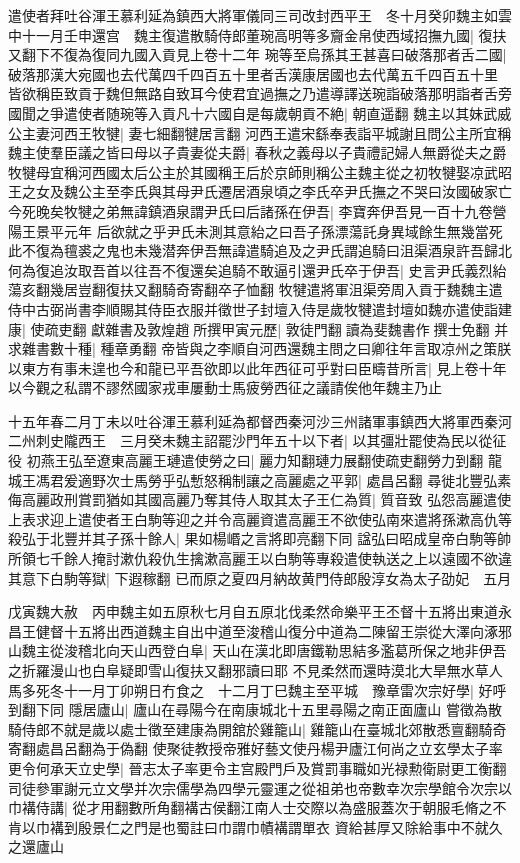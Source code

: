 遣使者拜吐谷渾王慕利延為鎮西大將軍儀同三司改封西平王　冬十月癸卯魏主如雲中十一月壬申還宫　魏主復遣散騎侍郎董琬高明等多齎金帛使西域招撫九國|{
	復扶又翻下不復為復同九國入貢見上卷十二年}
琬等至烏孫其王甚喜曰破落那者舌二國|{
	破落那漢大宛國也去代萬四千四百五十里者舌漢康居國也去代萬五千四百五十里}
皆欲稱臣致貢于魏但無路自致耳今使君宜過撫之乃遣導譯送琬詣破落那明詣者舌旁國聞之爭遣使者随琬等入貢凡十六國自是每歲朝貢不絶|{
	朝直遥翻}
魏主以其妹武威公主妻河西王牧犍|{
	妻七細翻犍居言翻}
河西王遣宋繇奉表詣平城謝且問公主所宜稱魏主使羣臣議之皆曰母以子貴妻從夫爵|{
	春秋之義母以子貴禮記婦人無爵從夫之爵}
牧犍母宜稱河西國太后公主於其國稱王后於京師則稱公主魏主從之初牧犍娶凉武昭王之女及魏公主至李氏與其母尹氏遷居酒泉頃之李氏卒尹氏撫之不哭曰汝國破家亡今死晚矣牧犍之弟無諱鎮酒泉謂尹氏曰后諸孫在伊吾|{
	李寶奔伊吾見一百十九卷營陽王景平元年}
后欲就之乎尹氏未測其意紿之曰吾子孫漂蕩託身異域餘生無幾當死此不復為氊裘之鬼也未幾潜奔伊吾無諱遣騎追及之尹氏謂追騎曰沮渠酒泉許吾歸北何為復追汝取吾首以往吾不復還矣追騎不敢逼引還尹氏卒于伊吾|{
	史言尹氏義烈紿蕩亥翻幾居豈翻復扶又翻騎奇寄翻卒子恤翻}
牧犍遣將軍沮渠旁周入貢于魏魏主遣侍中古弼尚書李順賜其侍臣衣服并徵世子封壇入侍是歲牧犍遣封壇如魏亦遣使詣建康|{
	使疏吏翻}
獻雜書及敦煌趙所撰甲寅元歷|{
	敦徒門翻讀為斐魏書作撰士免翻}
并求雜書數十種|{
	種章勇翻}
帝皆與之李順自河西還魏主問之曰卿往年言取凉州之策朕以東方有事未遑也今和龍已平吾欲即以此年西征可乎對曰臣疇昔所言|{
	見上卷十年}
以今觀之私謂不謬然國家戎車屢動士馬疲勞西征之議請俟他年魏主乃止

十五年春二月丁未以吐谷渾王慕利延為都督西秦河沙三州諸軍事鎮西大將軍西秦河二州刺史隴西王　三月癸未魏主詔罷沙門年五十以下者|{
	以其彊壯罷使為民以從征役}
初燕王弘至遼東高麗王璉遣使勞之曰|{
	麗力知翻璉力展翻使疏吏翻勞力到翻}
龍城王馮君爰適野次士馬勞乎弘慙怒稱制讓之高麗處之平郭|{
	處昌呂翻}
尋徙北豐弘素侮高麗政刑賞罰猶如其國高麗乃奪其侍人取其太子王仁為質|{
	質音致}
弘怨高麗遣使上表求迎上遣使者王白駒等迎之并令高麗資遣高麗王不欲使弘南來遣將孫漱高仇等殺弘于北豐并其子孫十餘人|{
	果如楊㟭之言將即亮翻下同}
諡弘曰昭成皇帝白駒等帥所領七千餘人掩討漱仇殺仇生擒漱高麗王以白駒等專殺遣使執送之上以遠國不欲違其意下白駒等獄|{
	下遐稼翻}
已而原之夏四月納故黄門侍郎殷淳女為太子劭妃　五月

戊寅魏大赦　丙申魏主如五原秋七月自五原北伐柔然命樂平王丕督十五將出東道永昌王健督十五將出西道魏主自出中道至浚稽山復分中道為二陳留王崇從大澤向涿邪山魏主從浚稽北向天山西登白阜|{
	天山在漢北即唐鐵勒思結多濫葛所保之地非伊吾之折羅漫山也白阜疑即雪山復扶又翻邪讀曰耶}
不見柔然而還時漠北大旱無水草人馬多死冬十一月丁卯朔日冇食之　十二月丁巳魏主至平城　豫章雷次宗好學|{
	好呼到翻下同}
隱居廬山|{
	廬山在尋陽今在南康城北十五里尋陽之南正面廬山}
嘗徵為散騎侍郎不就是歲以處士徵至建康為開舘於雞籠山|{
	雞籠山在臺城北郊散悉亶翻騎奇寄翻處昌呂翻為于偽翻}
使聚徒教授帝雅好藝文使丹楊尹廬江何尚之立玄學太子率更令何承天立史學|{
	晉志太子率更令主宫殿門戶及賞罰事職如光禄勲衛尉更工衡翻}
司徒參軍謝元立文學并次宗儒學為四學元靈運之從祖弟也帝數幸次宗學館令次宗以巾褠侍講|{
	從才用翻數所角翻褠古侯翻江南人士交際以為盛服蓋次于朝服毛脩之不肯以巾褠到殷景仁之門是也蜀註曰巾謂巾幘褠謂單衣}
資給甚厚又除給事中不就久之還廬山

